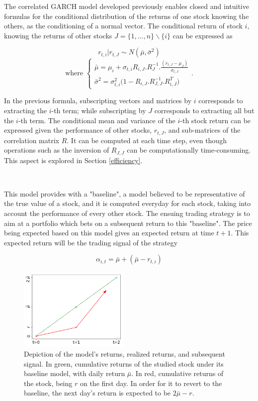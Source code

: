 \documentclass[letterpaper, 10 pt, conference]{ieeeconf}  %
\begin{document}
The correlated GARCH model developed previously enables closed and intuitive formulas for the conditional distribution of the returns of one stock knowing the others, as the conditioning of a normal vector. The conditional return of stock $i$, knowing the returns of other stocks $J = \{1, ...,n \} \backslash \{i\}$ can be expressed as

$$
r_{t, i}|r_{t, J} \sim N(\bar\mu, \bar\sigma^2)
$$
$$
\text{where } \left\{
                \begin{array}{ll}
               \bar\mu = \mu_{i} + \sigma_{t, i} R_{i, J} .R_{J}^{-1} .\frac{(r_{t, J} - \mu_{J})}{\sigma_{t, J}}
               \\
               \bar\sigma^2 = \sigma_{t, i}^2\big(1 - R_{i, J}.R_{J, J}^{-1}.R_{i, J}^T\big)
                \end{array}
\right..
$$

In the previous formula, subscripting vectors and matrices by $i$ corresponds to extracting the $i$-th term; while subscripting by $J$ corresponds to extracting all but the $i$-th term. The conditional mean and variance of the $i$-th stock return can be expressed given the performance of other stocks, $r_{t, J}$, and sub-matrices of the correlation matrix $R$. It can be computed at each time step, even though operations such as the inversion of $R_{J,J}$ can be computationally time-consuming. This aspect is explored in Section \ref{efficiency}.

\

This model provides with a "baseline", a model believed to be representative of the true value of a stock, and it is computed everyday for each stock, taking into account the performance of every other stock. The ensuing trading strategy is to aim at a portfolio which bets on a subsequent return to this "baseline". The price being expected based on this model gives an expected return at time $t+1$. This expected return will be the trading signal of the strategy

$$\alpha_{i, t} = \bar\mu + (\bar\mu - r_{t, i})$$

\begin{figure}[t]
\centering
\includegraphics[width=200px]{img/explanation}
\caption{Depiction of the model's returns, realized returns, and subsequent signal. In green, cumulative returns of the studied stock under its baseline model, with daily return $\bar\mu$. In red, cumulative returns of the stock, being $r$ on the first day. In order for it to revert to the baseline, the next day's return is expected to be $2 \bar\mu - r$.}
\label{explanation}
\end{figure}
\end{document}
